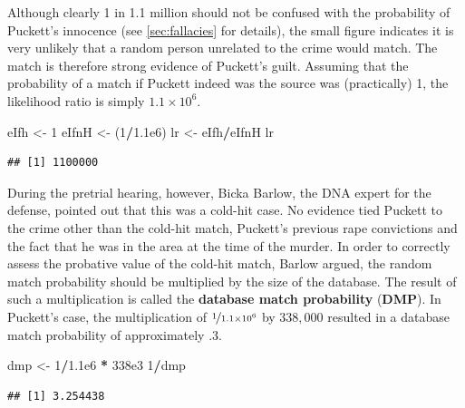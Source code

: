 \documentclass[10pt,dvipsnames,enabledeprecatedfontcommands]{scrartcl}
\newenvironment{Shaded}{\begin{snugshade}}{\end{snugshade}}
\newcommand{\DecValTok}[1]{\textcolor[rgb]{0.00,0.00,0.81}{#1}}
\newcommand{\FloatTok}[1]{\textcolor[rgb]{0.00,0.00,0.81}{#1}}
\newcommand{\StringTok}[1]{\textcolor[rgb]{0.31,0.60,0.02}{#1}}
\newcommand{\OperatorTok}[1]{\textcolor[rgb]{0.81,0.36,0.00}{\textbf{#1}}}
\newcommand{\NormalTok}[1]{#1}
\begin{document}
Although clearly 1 in 1.1 million should not be confused with the
probability of Puckett's innocence (see \ref{sec:fallacies} for
details), the small figure indicates it is
very unlikely that a random person unrelated to the crime would match.
The match is therefore strong evidence of Puckett's guilt. Assuming that
the probability of a match if Puckett indeed was the source was
(practically) 1, the likelihood ratio is simply \(1.1 \times 10^6\).


\begin{Shaded}
\begin{Highlighting}[]
\NormalTok{eIfh <-}\StringTok{ }\DecValTok{1}
\NormalTok{eIfnH <-}\StringTok{ }\NormalTok{(}\DecValTok{1}\OperatorTok{/}\FloatTok{1.1e6}\NormalTok{)}
\NormalTok{lr <-}\StringTok{ }\NormalTok{eIfh}\OperatorTok{/}\NormalTok{eIfnH}
\NormalTok{lr}
\end{Highlighting}
\end{Shaded}

\begin{verbatim}
## [1] 1100000
\end{verbatim}

During the pretrial hearing, however, Bicka Barlow, the DNA expert for
the defense, pointed out that this was a cold-hit case. No evidence tied
Puckett to the crime other than the cold-hit match, Puckett's previous
rape convictions and the fact that he was in the area at the time of the
murder. In order to correctly assess the probative value of the cold-hit
match, Barlow argued, the random match probability should be multiplied
by the size of the database. The result of such a multiplication is
called the \textbf{database match probability} (\textbf{DMP}). In
Puckett's case, the multiplication of \(\nicefrac{1}{1.1\times 10^6}\)
by \(338,000\) resulted in a database match probability of approximately
.3.


\begin{Shaded}
\begin{Highlighting}[]
\NormalTok{dmp <-}\StringTok{ }\DecValTok{1}\OperatorTok{/}\FloatTok{1.1e6} \OperatorTok{*}\StringTok{ }\FloatTok{338e3}
\DecValTok{1}\OperatorTok{/}\NormalTok{dmp}
\end{Highlighting}
\end{Shaded}

\begin{verbatim}
## [1] 3.254438
\end{verbatim}
\end{document}
